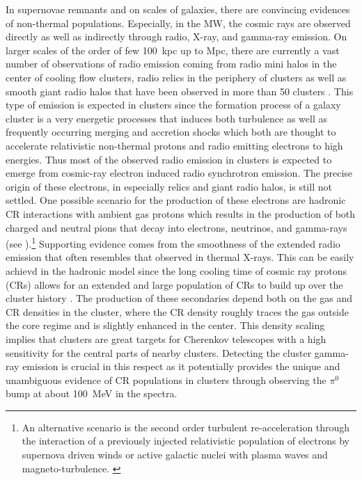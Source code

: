 \documentclass[10pt,aps,pra,reprint,amsmath,amsfonts,amssymb,showpacs,nofootinbib,floatfix]{revtex4-1}
\begin{document}
In supernovae remnants and on scales of galaxies, there are convincing
evidences of non-thermal populations. Especially, in the MW, the
cosmic rays are observed directly as well as indirectly through radio,
X-ray, and gamma-ray emission. On larger scales of the order of few
100~kpc up to Mpc, there are currently a vast number of observations
of radio emission coming from radio mini halos in the center of
cooling flow clusters, radio relics in the periphery of clusters
\cite{2004rcfg.proc..335K} as well as smooth giant radio halos that
have been observed in more than 50 clusters
\cite{2003ASPC..301..143F,2008SSRv..134...93F}. This type of emission
is expected in clusters since the formation process of a galaxy
cluster is a very energetic processes that induces both turbulence as
well as frequently occurring merging and accretion shocks which both
are thought to accelerate relativistic non-thermal protons and radio
emitting electrons to high energies. Thus most of the observed radio
emission in clusters is expected to emerge from cosmic-ray electron
induced radio synchrotron emission. The precise origin of these
electrons, in especially relics and giant radio halos, is still not
settled. One possible scenario for the production of these electrons
are hadronic CR interactions with ambient gas protons which results in
the production of both charged and neutral pions that decay into
electrons, neutrinos, and gamma-rays (see
\cite{1980ApJ...239L..93D,1982AJ.....87.1266V,1999APh....12..169B,2000A&A...362..151D,2001ApJ...559...59M,2003MNRAS.342.1009M,2004A&A...413...17P,2004MNRAS.352...76P,2008MNRAS.385.1211P,2008MNRAS.385.1242P,2009JCAP...09..024K,2010MNRAS.401...47D,2010MNRAS.407.1565D,2010ApJ...722..737K,2011A&A...527A..99E}
).\footnote{An alternative scenario is the second order turbulent
  re-acceleration through the interaction of a previously injected
  relativistic population of electrons by supernova driven winds or
  active galactic nuclei with plasma waves and
  magneto-turbulence. \protect
  \cite{1987A&A...182...21S,1993ApJ...406..399G,2004MNRAS.350.1174B,2005MNRAS.363.1173B,2007MNRAS.378..245B,2011MNRAS.410..127B,2009A&A...507..661B}}
Supporting evidence comes from the smoothness of the extended radio
emission that often resembles that observed in thermal X-rays. This
can be easily achievd in the hadronic model since the long cooling
time of cosmic ray protons (CRs) allows for an extended and large
population of CRs to build up over the cluster history
\citep{1996SSRv...75..279V, 1997ApJ...477..560E,
  1997ApJ...487..529B}. The production of these secondaries depend
both on the gas and CR densities in the cluster, where the CR
density roughly traces the gas outside the core regime and is slightly
enhanced in the center.  This density scaling implies that clusters
are great targets for Cherenkov telescopes with a high sensitivity for
the central parts of nearby clusters. Detecting the cluster gamma-ray
emission is crucial in this respect as it potentially provides the
unique and unambiguous evidence of CR populations in clusters through
observing the $\pi^0$ bump at about 100~MeV in the spectra.
\end{document}
